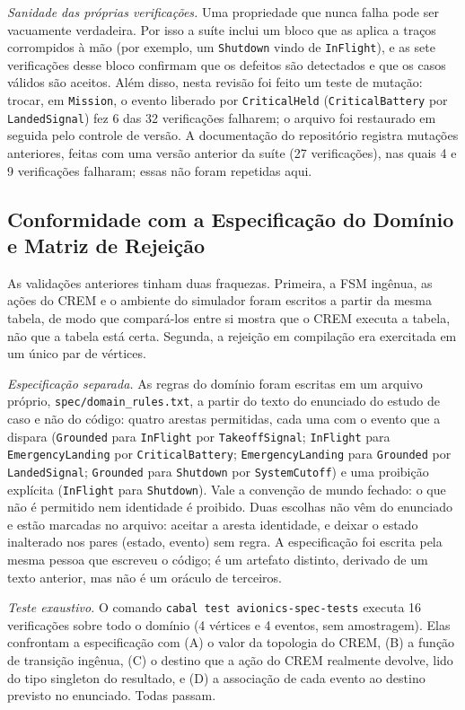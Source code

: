 \documentclass[12pt,a4paper]{article}
\begin{document}
\textit{Sanidade das próprias verificações.} Uma propriedade que nunca falha pode ser vacuamente verdadeira. Por isso a suíte inclui um bloco que as aplica a traços corrompidos à mão (por exemplo, um \texttt{Shutdown} vindo de \texttt{InFlight}), e as sete verificações desse bloco confirmam que os defeitos são detectados e que os casos válidos são aceitos. Além disso, nesta revisão foi feito um teste de mutação: trocar, em \texttt{Mission}, o evento liberado por \texttt{CriticalHeld} (\texttt{CriticalBattery} por \texttt{LandedSignal}) fez 6 das 32 verificações falharem; o arquivo foi restaurado em seguida pelo controle de versão. A documentação do repositório registra mutações anteriores, feitas com uma versão anterior da suíte (27 verificações), nas quais 4 e 9 verificações falharam; essas não foram repetidas aqui.

\subsection{Conformidade com a Especificação do Domínio e Matriz de Rejeição}

As validações anteriores tinham duas fraquezas. Primeira, a FSM ingênua, as ações do CREM e o ambiente do simulador foram escritos a partir da mesma tabela, de modo que compará-los entre si mostra que o CREM executa a tabela, não que a tabela está certa. Segunda, a rejeição em compilação era exercitada em um único par de vértices.

\textit{Especificação separada.} As regras do domínio foram escritas em um arquivo próprio, \texttt{spec/domain\_rules.txt}, a partir do texto do enunciado do estudo de caso e não do código: quatro arestas permitidas, cada uma com o evento que a dispara (\texttt{Grounded} para \texttt{InFlight} por \texttt{TakeoffSignal}; \texttt{InFlight} para \texttt{EmergencyLanding} por \texttt{CriticalBattery}; \texttt{EmergencyLanding} para \texttt{Grounded} por \texttt{LandedSignal}; \texttt{Grounded} para \texttt{Shutdown} por \texttt{SystemCutoff}) e uma proibição explícita (\texttt{InFlight} para \texttt{Shutdown}). Vale a convenção de mundo fechado: o que não é permitido nem identidade é proibido. Duas escolhas não vêm do enunciado e estão marcadas no arquivo: aceitar a aresta identidade, e deixar o estado inalterado nos pares (estado, evento) sem regra. A especificação foi escrita pela mesma pessoa que escreveu o código; é um artefato distinto, derivado de um texto anterior, mas não é um oráculo de terceiros.

\textit{Teste exaustivo.} O comando \texttt{cabal test avionics-spec-tests} executa 16 verificações sobre todo o domínio (4 vértices e 4 eventos, sem amostragem). Elas confrontam a especificação com (A) o valor da topologia do CREM, (B) a função de transição ingênua, (C) o destino que a ação do CREM realmente devolve, lido do tipo singleton do resultado, e (D) a associação de cada evento ao destino previsto no enunciado. Todas passam.
\end{document}
